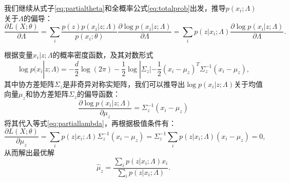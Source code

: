 我们继续从式子\eqref{eq:partialtheta}和全概率公式\eqref{eq:totalprob}出发，推导$p(x_i; \Lambda)$关于$\Lambda$的偏导：
\begin{equation}\label{eq:partiallambda}
    \frac{\partial L(X; \theta)}{\partial \Lambda}%
    = \sum\limits_i \frac{p(z) p(x_i|z;\Lambda)}{p(x_i; \theta)} \frac{\partial \log p(x_i|z;\Lambda)}{\partial \Lambda}
    = \sum\limits_i p(z|x_i;\Lambda) \frac{\partial \log p(x_i|z;\Lambda)}{\partial \Lambda}.
\end{equation}

根据变量$x_i|z;\Lambda$的概率密度函数，及其对数形式
\[
  \log p(x_i|z;\Lambda) = - \frac{d}{2} \log (2\pi) - \frac{1}{2} \log |\Sigma_z| - \frac{1}{2} (x_i - \mu_z)^T \Sigma_z^{-1} (x_i - \mu_z),
\]
其中协方差矩阵$\Sigma_z$是非奇异对称实矩阵，我们可以推导出$\log p(x_i|z;\Lambda)$关于均值向量$\mu_z$和协方差矩阵$\Sigma_z$的偏导函数：
\[
    \frac{\partial \log p(x_i|z;\Lambda)}{\partial \mu_z} %
    = \Sigma_z^{-1} (x_i - \mu_z)
\]
将其代入等式\eqref{eq:partiallambda}，再根据极值条件有：
\[
    \frac{\partial L(X; \theta)}{\partial \mu_z} = \sum\limits_i p(z|x_i;\Lambda) \Sigma_z^{-1} (x_i - \mu_z)
    = \Sigma_z^{-1} \sum\limits_i p(z|x_i;\Lambda) (x_i - \mu_z)
    = 0,
\]
从而解出最优解
\begin{equation}\label{optimalmuz}
    \hat \mu_z = \frac{\sum\limits_i p(z|x_i;\Lambda) x_i}{\sum\limits_i p(z|x_i;\Lambda)}.
\end{equation}

